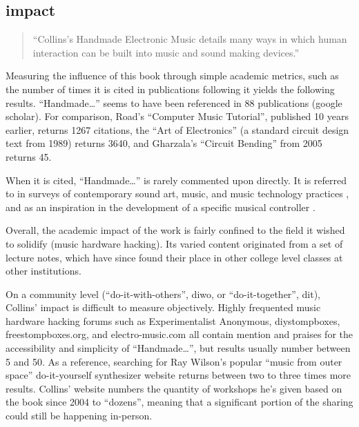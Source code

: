 \begin{itemize}
\subsection{impact}  

\begin{quote}

“Collins’s Handmade Electronic Music details many ways in which human interaction can be built into music and sound making devices.” \cite{mills2010}

\end{quote}

	Measuring the influence of this book through simple academic metrics, such as the number of times it is cited in publications following it \cite{harzing2008} yields the following results. “Handmade…” seems to have been referenced in 88 publications (google scholar). For comparison, Road’s “Computer Music Tutorial”, published 10 years earlier, returns 1267 citations, the “Art of Electronics” (a standard circuit design text from 1989) returns 3640, and Gharzala’s “Circuit Bending” from 2005 returns 45. 

	When it is cited, “Handmade…” is rarely commented upon directly. It is referred to in surveys of contemporary sound art, music, and music technology practices \cite{kelly2011,mills2010,pigott2011,rodgers2010}, and as an inspiration in the development of a specific musical controller \cite{ariza2007,hoadley2010,murphy2010,riis2013,valle2011}.
	
	Overall, the academic impact of the work is fairly confined to the field it wished to solidify (music hardware hacking). Its varied content originated from a set of lecture notes, which have since found their place in other college level classes at other institutions. 

On a community level (“do-it-with-others”, diwo, or “do-it-together”, dit), Collins’ impact is difficult to measure objectively. Highly frequented music hardware hacking forums such as Experimentalist Anonymous, diystompboxes, freestompboxes.org, and electro-music.com all contain mention and praises for the accessibility and simplicity of “Handmade…”, but results usually number between 5 and 50. As a reference, searching for Ray Wilson’s popular “music from outer space” do-it-yourself synthesizer website returns between two to three times more results. Collins’ website numbers the quantity of workshops he’s given based on the book since 2004 to “dozens”, meaning that a significant portion of the sharing could still be happening in-person.  


\end{itemize}
